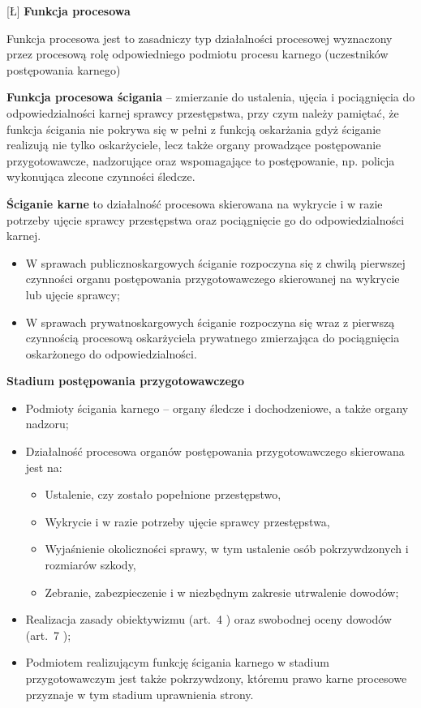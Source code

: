 \setcounter{zagc}{6}[Ł]
\noindent\textbf{Funkcja procesowa}\medskip

Funkcja procesowa jest to zasadniczy typ działalności procesowej wyznaczony przez procesową rolę odpowiedniego podmiotu procesu karnego (uczestników postępowania karnego)\medskip

\textbf{Funkcja procesowa ścigania} – zmierzanie do ustalenia, ujęcia i pociągnięcia do odpowiedzialności karnej sprawcy przestępstwa, przy czym należy pamiętać, że funkcja ścigania nie pokrywa się w pełni z funkcją oskarżania gdyż ściganie realizują nie tylko oskarżyciele, lecz także organy prowadzące postępowanie przygotowawcze, nadzorujące oraz wspomagające to postępowanie, np. policja wykonująca zlecone czynności śledcze.\medskip

\textbf{Ściganie karne} to działalność procesowa skierowana na wykrycie i w razie potrzeby ujęcie sprawcy przestępstwa oraz pociągnięcie go do odpowiedzialności karnej.\begin{itemize}
    \item W sprawach publicznoskargowych ściganie rozpoczyna się z chwilą pierwszej czynności organu postępowania przygotowawczego skierowanej na wykrycie lub ujęcie sprawcy;
    \item W sprawach prywatnoskargowych ściganie rozpoczyna się wraz z pierwszą czynnością procesową oskarżyciela prywatnego zmierzająca do pociągnięcia oskarżonego do odpowiedzialności.
\end{itemize}

\textbf{Stadium postępowania przygotowawczego}\begin{itemize}
    \item Podmioty ścigania karnego – organy śledcze i dochodzeniowe, a także organy nadzoru;
    \item Działalność procesowa organów postępowania przygotowawczego skierowana jest na:\begin{itemize}
        \item Ustalenie, czy zostało popełnione przestępstwo,
        \item Wykrycie i w razie potrzeby ujęcie sprawcy przestępstwa,
        \item Wyjaśnienie okoliczności sprawy, w tym ustalenie osób pokrzywdzonych i rozmiarów szkody,
        \item Zebranie, zabezpieczenie i w niezbędnym zakresie utrwalenie dowodów;
    \end{itemize}
    \item Realizacja zasady obiektywizmu (art. 4 ) oraz swobodnej oceny dowodów (art. 7 );
    \item Podmiotem realizującym funkcję ścigania karnego w stadium przygotowawczym jest także pokrzywdzony, któremu prawo karne procesowe przyznaje w tym stadium uprawnienia strony.
\end{itemize}

